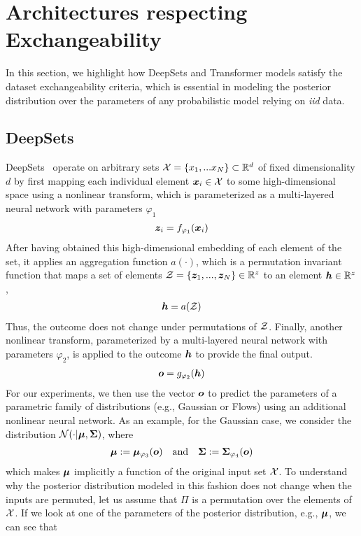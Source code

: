 \section{Architectures respecting Exchangeability}
\label{appdx:exchangeability}
In this section, we highlight how DeepSets and Transformer models satisfy the dataset exchangeability criteria, which is essential in modeling the posterior distribution over the parameters of any probabilistic model relying on \textit{iid} data. 

\subsection{DeepSets}
DeepSets~\citep{Zaheer2017deepsets} operate on arbitrary sets ${\mathcal{X}} = \{x_1, ... x_N\} \subset \mathbb{R}^d$ of fixed dimensionality $d$ by first mapping each individual element ${\bm{x}}_i \in {\mathcal{X}}$ to some high-dimensional space using a nonlinear transform, which is parameterized as a multi-layered neural network with parameters $\varphi_1$
\begin{align}
    {\bm{z}}_i = f_{\varphi_1}({\bm{x}}_i)
\end{align}
After having obtained this high-dimensional embedding of each element of the set, it applies an aggregation function $a(\cdot)$, which is a permutation invariant function that maps a set of elements ${\mathcal{Z}} = \{{\bm{z}}_1, ..., {\bm{z}}_N\} \in \mathbb{R}^z$ to an element ${\bm{h}} \in \mathbb{R}^z$,
\begin{align}
    {\bm{h}} = a({\mathcal{Z}})
\end{align}
Thus, the outcome does not change under permutations of ${\mathcal{Z}}$. Finally, another nonlinear transform, parameterized by a multi-layered neural network with parameters $\varphi_2$, is applied to the outcome ${\bm{h}}$ to provide the final output.
\begin{align}
    {\bm{o}} = g_{\varphi_2}({\bm{h}})
\end{align}
For our experiments, we then use the vector ${\bm{o}}$ to predict the parameters of a parametric family of distributions (e.g., Gaussian or Flows) using an additional nonlinear neural network. As an example, for the Gaussian case, we consider the distribution ${\mathcal{N}}(\cdot | {\bm{\mu}}, {\bm{\Sigma}})$, where
\begin{align}
    {\bm{\mu}}:= {\bm{\mu}}_{\varphi_3}({\bm{o}}) \quad\text{and}\quad{\bm{\Sigma}} := {\bm{\Sigma}}_{\varphi_4}({\bm{o}})
\end{align}
which makes ${\bm{\mu}}$ implicitly a function of the original input set ${\mathcal{X}}$. To understand why the posterior distribution modeled in this fashion does not change when the inputs are permuted, let us assume that $\Pi$ is a permutation over the elements of ${\mathcal{X}}$. If we look at one of the parameters of the posterior distribution, e.g., ${\bm{\mu}}$, we can see that
